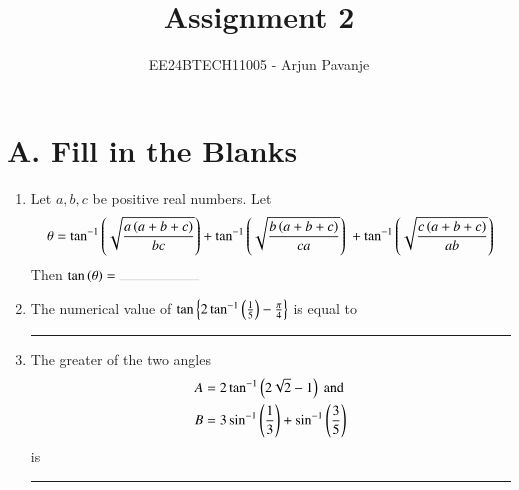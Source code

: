 \documentclass[journal,12pt,onecolumn,article]{IEEEtran}
\theoremstyle{remark}
\begin{document}

\vspace{3cm}

\title{Assignment 2}
\author{EE24BTECH11005 - Arjun Pavanje}
\maketitle
\renewcommand{\thefigure}{\theenumi}
\renewcommand{\thetable}{\theenumi}
\section*{A. Fill in the Blanks}
\begin{enumerate}
\item Let $a,b,c$ be positive real numbers. Let
\begin{multline*}
\theta = \tan ^{-1}\left(\sqrt{\frac{a\left(a+b+c\right)}{bc}}\right) + \tan ^{-1}\left(\sqrt{\frac{b\left(a+b+c\right)}{ca}}\right)\ + \tan ^{-1}\left(\sqrt{\frac{c\left(a+b+c\right)}{ab}}\right) 
\end{multline*}
Then $\tan \brak{\theta}= \rule{2cm}{0.1pt}$ 
\hfill {}
\item The numerical value of $\tan \left\{ 2\tan ^{-1}\left(\frac{1}{5}\right)-\frac{\pi}{4}\right\}$ is equal to \rule{2cm}{0.1pt}
\hfill {}
\item The greater of the two angles 
\begin{align*}
A &= 2 \tan ^{-1}\left(2\sqrt{2}-1\right) \text{ and}\\
B &= 3\sin ^{-1}\left(\frac{1}{3}\right) + \sin ^{-1}\left(\frac{3}{5}\right)
\end{align*}
is \rule{2cm}{0.1pt}
\hfill {}
\end{enumerate}
\end{document}

